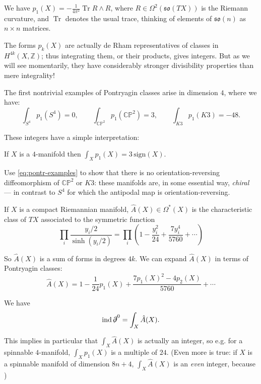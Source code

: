 \documentclass[12pt,letterpaper,reqno]{article}
\numberwithin{equation}{section}
\newcommand{\fso}{{\mathfrak {so}}}
\newcommand{\C}{\ensuremath{\mathbb C}}
\newcommand{\PP}{\ensuremath{\mathbb P}}
\newcommand{\Z}{\ensuremath{\mathbb Z}}
\newcommand{\dirac}{\slashed{\partial}}
\newcommand{\ti}[1]{\textit{#1}}
\DeclareMathOperator{\Tr}{Tr}
\DeclareMathOperator{\ind}{ind}
\newcommand{\fixme}[1]{{\color{orange}{[#1]}}}
\begin{document}
\begin{example}
We have $p_1(X) = -\frac{1}{4\pi^2} \Tr R \wedge R$, where
$R \in \Omega^2(\fso(TX))$ is the Riemann curvature, and $\Tr$ denotes
the usual trace, thinking of elements of $\fso(n)$ as $n \times n$ matrices.
\end{example}

The forms $p_k(X)$ are actually de Rham representatives of classes in $H^{4k}(X,\Z)$;
thus integrating them, or their products, gives integers.
But as we will see momentarily, they have considerably stronger 
divisibility properties than mere integrality!

\begin{example} The first nontrivial examples of Pontryagin classes arise in
dimension $4$, where we have:
\begin{equation} \label{eq:pontr-examples}
\int_{S^4} p_1(S^4) = 0, \qquad \int_{\C\PP^2} p_1(\C\PP^2) = 3, \qquad \int_{K3} p_1(K3) = -48.
\end{equation}
\end{example}
These integers have a simple interpretation:
\begin{thm} If $X$ is a $4$-manifold then $\int_X p_1(X) = 3 \, {\mathrm{sign}}(X)$.
\end{thm}

\begin{exercise} Use \eqref{eq:pontr-examples} to
show that there is no orientation-reversing diffeomorphism of $\C\PP^2$ or $K3$:
these manifolds are, in some essential way, \ti{chiral} --- in contrast to $S^4$
for which the antipodal map is orientation-reversing.
\end{exercise}

\begin{defn} \label{def:ahat} 
If $X$ is a compact Riemannian manifold, $\hat A(X) \in \Omega^*(X)$
is the characteristic class of $TX$ associated to the symmetric function
\begin{equation}
  \prod_i \frac{y_i/2}{\sinh(y_i/2)} = \prod_i \left( 1 - \frac{y_i^2}{24} + \frac{7 y_i^4}{5760} + \cdots \right)
\end{equation}
\end{defn}
So $\hat A(X)$ is a sum of forms in degrees $4k$.
We can expand $\hat A(X)$ in terms of Pontryagin classes:
\begin{equation}
  \hat A(X) = 1 - \frac{1}{24} p_1(X) + \frac{7 p_1(X)^2 - 4 p_2(X)}{5760} + \cdots
\end{equation}

\begin{thm}
\label{thm:atiyah-singer}
We have
\begin{equation}
  \ind \dirac^0 = \int_X \hat A(X).
\end{equation}
\end{thm}
This implies in particular that $\int_X \hat A(X)$ is actually an integer, so
e.g. for a spinnable $4$-manifold, $\int_X p_1(X)$ is a multiple of $24$.
(Even more is true: if $X$ is a spinnable
manifold of dimension $8n+4$, $\int_X \hat A(X)$ is an \ti{even} integer,
because \fixme{...})
\end{document}
